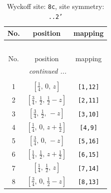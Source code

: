 \documentclass[fleqn,8pt]{jsarticle}
\begin{document}
\begin{longtable}{ccc}
\caption{Wyckoff site: {\tt 8c}, site symmetry: {\tt ..2'}}
 \\
 \hline \hline
No. & position & mapping \\ \hline \endfirsthead

\multicolumn{2}{l}{\tablename\ \thetable{}} \\
 \hline \hline
No. & position & mapping \\ \hline \endhead

 \hline \hline
\multicolumn{2}{r}{\footnotesize\it continued ...} \\ \endfoot

 \hline \hline
\multicolumn{2}{r}{} \\ \endlastfoot

1 & $\left[ \frac{1}{4},\, 0,\, z \right]$ & {\tt [1,12]} \\ \hline
2 & $\left[ \frac{3}{4},\, \frac{1}{2},\, \frac{1}{2} - z \right]$ & {\tt [2,11]} \\ \hline
3 & $\left[ \frac{3}{4},\, \frac{1}{2},\, - z \right]$ & {\tt [3,10]} \\ \hline
4 & $\left[ \frac{1}{4},\, 0,\, z + \frac{1}{2} \right]$ & {\tt [4,9]} \\ \hline
5 & $\left[ \frac{3}{4},\, 0,\, - z \right]$ & {\tt [5,16]} \\ \hline
6 & $\left[ \frac{1}{4},\, \frac{1}{2},\, z + \frac{1}{2} \right]$ & {\tt [6,15]} \\ \hline
7 & $\left[ \frac{1}{4},\, \frac{1}{2},\, z \right]$ & {\tt [7,14]} \\ \hline
8 & $\left[ \frac{3}{4},\, 0,\, \frac{1}{2} - z \right]$ & {\tt [8,13]} \\
\end{longtable}
\renewcommand{\arraystretch}{1.2}
\end{document}
